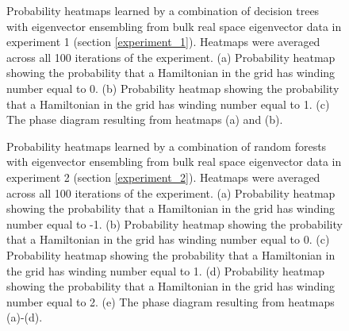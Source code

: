 \documentclass[10pt]{revtex4-1}
\newcommand\SSHOneWindingZero{./ssh1_imshow_winding_grid_winding_0_sim.png}
\newcommand\SSHOneWindingOne{./ssh1_imshow_winding_grid_winding_1_sim.png}
\newcommand\SSHOneHeatmap{./ssh1_merge_imshow_winding_grids_second_sim.png}
\newcommand\SSHTwoWindingMinusOne{./ssh2_imshow_winding_grid_winding_-1_sim.png}
\newcommand\SSHTwoWindingZero{./ssh2_imshow_winding_grid_winding_0_sim.png}
\newcommand\SSHTwoWindingOne{./ssh2_imshow_winding_grid_winding_1_sim.png}
\newcommand\SSHTwoWindingTwo{./ssh2_imshow_winding_grid_winding_2_sim.png}
\newcommand\SSHTwoHeatmap{./ssh2_merge_imshow_winding_grids_sim.png}
\begin{document}
\begin{figure}
\centering
{}
\caption{Probability heatmaps learned by a combination of decision trees with eigenvector ensembling from bulk real space eigenvector data in experiment 1 (section \ref{experiment_1}). Heatmaps were averaged across all 100 iterations of the experiment. (a) Probability heatmap showing the probability that a Hamiltonian in the grid has winding number equal to 0.  (b) Probability heatmap showing the probability that a Hamiltonian in the grid has winding number equal to 1. (c) The phase diagram resulting from heatmaps (a) and (b).}
\label{ssh1_heatmaps}
\end{figure}

\begin{figure}
\centering
{}
\caption{Probability heatmaps learned by a combination of random forests with eigenvector ensembling from bulk real space eigenvector data in experiment 2 (section \ref{experiment_2}). Heatmaps were averaged across all 100 iterations of the experiment. (a) Probability heatmap showing the probability that a Hamiltonian in the grid has winding number equal to -1.  (b) Probability heatmap showing the probability that a Hamiltonian in the grid has winding number equal to 0. (c) Probability heatmap showing the probability that a Hamiltonian in the grid has winding number equal to 1. (d) Probability heatmap showing the probability that a Hamiltonian in the grid has winding number equal to 2. (e) The phase diagram resulting from heatmaps (a)-(d).}
\label{ssh2_heatmaps}
\end{figure}
\end{document}
